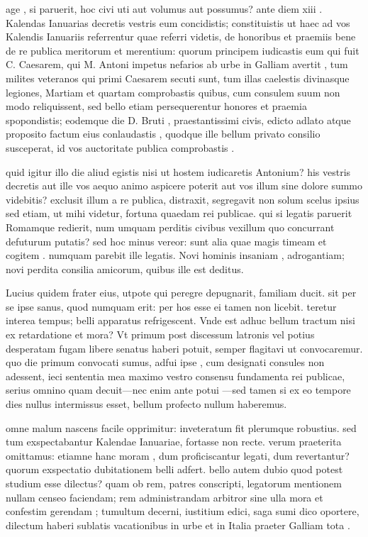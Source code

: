  age , si paruerit, hoc civi uti aut volumus aut possumus? ante diem xiii . Kalendas Ianuarias decretis vestris eum concidistis; constituistis ut haec ad vos Kalendis Ianuariis referrentur quae referri videtis, de honoribus et praemiis bene de re publica meritorum et merentium: quorum principem iudicastis eum qui fuit C. Caesarem, qui M. Antoni impetus nefarios ab urbe in Galliam avertit , tum milites veteranos qui primi Caesarem secuti sunt, tum illas caelestis divinasque legiones, Martiam et quartam comprobastis quibus, cum consulem suum non modo reliquissent, sed bello etiam persequerentur honores et praemia spopondistis; eodemque die D. Bruti , praestantissimi civis, edicto adlato atque proposito factum eius conlaudastis , quodque ille bellum privato consilio susceperat, id vos auctoritate publica comprobastis .

 quid igitur illo die aliud egistis nisi ut hostem iudicaretis Antonium? his vestris decretis aut ille vos aequo animo aspicere poterit aut vos illum sine dolore summo videbitis? exclusit illum a re publica, distraxit, segregavit non solum scelus ipsius sed etiam, ut mihi videtur, fortuna quaedam rei publicae. qui si legatis paruerit Romamque redierit, num umquam perditis civibus vexillum quo concurrant defuturum putatis? sed hoc minus vereor: sunt alia quae magis timeam et cogitem . numquam parebit ille legatis. Novi hominis insaniam , adrogantiam; novi perdita consilia amicorum, quibus ille est deditus.

 Lucius quidem frater eius, utpote qui peregre depugnarit, familiam ducit. sit per se ipse sanus, quod numquam erit: per hos esse ei tamen non licebit. teretur interea tempus; belli apparatus refrigescent. Vnde est adhuc bellum tractum nisi ex retardatione et mora? Vt primum post discessum latronis vel potius desperatam fugam libere senatus haberi potuit, semper flagitavi ut convocaremur. quo die primum convocati sumus, adfui ipse , cum designati consules non adessent, ieci sententia mea maximo vestro consensu fundamenta rei publicae, serius omnino quam decuit—nec enim ante potui —sed tamen si ex eo tempore dies nullus intermissus esset, bellum profecto nullum haberemus.

 omne malum nascens facile opprimitur: inveteratum fit plerumque robustius. sed tum exspectabantur Kalendae Ianuariae, fortasse non recte. verum praeterita omittamus: etiamne hanc moram , dum proficiscantur legati, dum revertantur? quorum exspectatio dubitationem belli adfert. bello autem dubio quod potest studium esse dilectus? quam ob rem, patres conscripti, legatorum mentionem nullam censeo faciendam; rem administrandam arbitror sine ulla mora et confestim gerendam ; tumultum decerni, iustitium edici, saga sumi dico oportere, dilectum haberi sublatis vacationibus in urbe et in Italia praeter Galliam tota .

